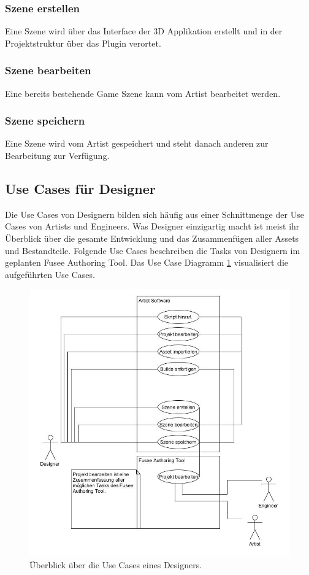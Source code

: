 \documentclass[pagesize, paper=a4, fontsize=12pt, titlepage=true, headings=small, headnosepline, abstractoff, liststotoc, nochapterprefix, plainheadsepline, twoside]{scrreprt}
\begin{document}
\subsubsection{Szene erstellen}
Eine Szene wird über das Interface der 3D Applikation erstellt und in der Projektstruktur über das Plugin verortet.

\subsubsection{Szene bearbeiten}
Eine bereits bestehende Game Szene kann vom Artist bearbeitet werden.

\subsubsection{Szene speichern}
Eine Szene wird vom Artist gespeichert und steht danach anderen zur Bearbeitung zur Verfügung.

\subsection{Use Cases für Designer}
Die Use Cases von Designern bilden sich häufig aus einer Schnittmenge der Use Cases von Artists und Engineers. Was Designer einzigartig macht ist meist ihr Überblick über die gesamte Entwicklung und das Zusammenfügen aller Assets und Bestandteile. Folgende Use Cases beschreiben die Tasks von Designern im geplanten Fusee Authoring Tool. Das Use Case Diagramm \ref{UseCaseDesigner} visualisiert die aufgeführten Use Cases.

\begin{figure}[ht]
	\centering
	\includegraphics[width=\linewidth - 2cm]{Bilder/UseCase_Designer.jpg}
	\caption{Überblick über die Use Cases eines Designers.}
	\label{UseCaseDesigner}
\end{figure}
\end{document}
